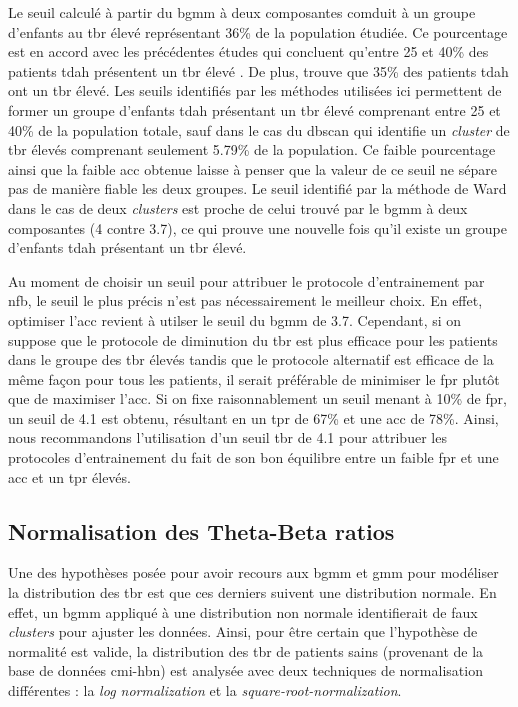 Le seuil calculé à partir du \gls{bgmm} à deux composantes comduit à un groupe d'enfants au \gls{tbr} élevé représentant 36\% de la population étudiée. 
Ce pourcentage est en accord avec les précédentes études qui concluent qu'entre 25 et 40\% des patients \gls{tdah} présentent un \gls{tbr} élevé \citep{Arns2012}. 
De plus,\citep{Clarke2011} trouve que 35\% des patients \gls{tdah} ont un \gls{tbr} élevé. 
Les seuils identifiés par les méthodes utilisées ici permettent de former un groupe d'enfants \gls{tdah} présentant un \gls{tbr} élevé comprenant entre
25 et 40\% de la population totale, sauf dans le cas du \gls{dbscan} qui identifie un \textit{cluster}
de \gls{tbr} élevés comprenant seulement 5.79\% de la population. Ce faible pourcentage ainsi que la faible \gls{acc} obtenue laisse à penser
que la valeur de ce seuil ne sépare pas de manière fiable les deux groupes. Le seuil identifié par la méthode de Ward dans le cas de deux \textit{clusters}
est proche de celui trouvé par le \gls{bgmm} à deux composantes (4 contre 3.7), ce qui prouve une nouvelle fois qu'il existe un groupe d'enfants \gls{tdah}
présentant un \gls{tbr} élevé.

Au moment de choisir un seuil pour attribuer le protocole d'entrainement par \gls{nfb}, le seuil le plus précis n'est pas nécessairement le meilleur choix.
En effet, optimiser l'\gls{acc} revient à utilser le seuil du \gls{bgmm} de 3.7. Cependant, si on suppose que le protocole de diminution du \gls{tbr} est plus 
efficace pour les patients dans le groupe des \gls{tbr} élevés tandis que le protocole alternatif est efficace de la même façon pour tous les patients, il 
serait préférable de minimiser le \gls{fpr} plutôt que de maximiser l'\gls{acc}. Si on fixe raisonnablement un seuil menant à 10\% de \gls{fpr}, un seuil de 4.1
est obtenu, résultant en un \gls{tpr} de 67\% et une \gls{acc} de 78\%. Ainsi, nous recommandons l'utilisation d'un seuil \gls{tbr} de 4.1 pour attribuer
les protocoles d'entrainement du fait de son bon équilibre entre un faible \gls{fpr} et une \gls{acc} et un \gls{tpr} élevés. 
  
\subsection{Normalisation des Theta-Beta ratios}

Une des hypothèses posée pour avoir recours aux \gls{bgmm} et \gls{gmm} pour modéliser la distribution des \gls{tbr} est que ces derniers suivent une
distribution normale. En effet, un \gls{bgmm} appliqué à une distribution non normale identifierait de faux \textit{clusters} pour ajuster les données. 
Ainsi, pour être certain que l'hypothèse de normalité est valide, la distribution des \gls{tbr} de patients sains (provenant de la base de données \gls{cmi-hbn})
est analysée avec deux techniques de normalisation différentes : la \textit{log normalization} et la \textit{square-root-normalization}.

